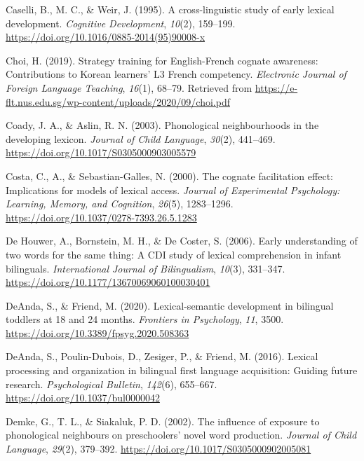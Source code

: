 \documentclass[
  ,man,floatsintext]{apa6}
\newlength{\cslhangindent}
\newlength{\cslentryspacingunit} %
\newenvironment{CSLReferences}[2] %
 {%
  \setlength{\parindent}{0pt}
  \ifodd #1
  \let\oldpar\par
  \def\par{\hangindent=\cslhangindent\oldpar}
  \fi
  \setlength{\parskip}{#2\cslentryspacingunit}
 }%
 {}
\begin{document}
\begin{CSLReferences}{1}{0}
\leavevmode{}%
Caselli, B., M. C., \& Weir, J. (1995). A cross-linguistic study of early lexical development. \emph{Cognitive Development}, \emph{10}(2), 159--199. \url{https://doi.org/10.1016/0885-2014(95)90008-x}

\leavevmode{}%
Choi, H. (2019). Strategy training for {E}nglish-{F}rench cognate awareness: Contributions to {K}orean learners' L3 {F}rench competency. \emph{Electronic Journal of Foreign Language Teaching}, \emph{16}(1), 68--79. Retrieved from \url{https://e-flt.nus.edu.sg/wp-content/uploads/2020/09/choi.pdf}

\leavevmode{}%
Coady, J. A., \& Aslin, R. N. (2003). Phonological neighbourhoods in the developing lexicon. \emph{Journal of Child Language}, \emph{30}(2), 441--469. \url{https://doi.org/10.1017/S0305000903005579}

\leavevmode{}%
Costa, C., A., \& Sebastian-Galles, N. (2000). The cognate facilitation effect: Implications for models of lexical access. \emph{Journal of Experimental Psychology: Learning, Memory, and Cognition}, \emph{26}(5), 1283--1296. \url{https://doi.org/10.1037/0278-7393.26.5.1283}

\leavevmode{}%
De Houwer, A., Bornstein, M. H., \& De Coster, S. (2006). Early understanding of two words for the same thing: A {CDI} study of lexical comprehension in infant bilinguals. \emph{International Journal of Bilingualism}, \emph{10}(3), 331--347. \url{https://doi.org/10.1177/13670069060100030401}

\leavevmode{}%
DeAnda, S., \& Friend, M. (2020). Lexical-semantic development in bilingual toddlers at 18 and 24 months. \emph{Frontiers in Psychology}, \emph{11}, 3500. \url{https://doi.org/10.3389/fpsyg.2020.508363}

\leavevmode{}%
DeAnda, S., Poulin-Dubois, D., Zesiger, P., \& Friend, M. (2016). Lexical processing and organization in bilingual first language acquisition: Guiding future research. \emph{Psychological Bulletin}, \emph{142}(6), 655--667. \url{https://doi.org/10.1037/bul0000042}

\leavevmode{}%
Demke, G., T. L., \& Siakaluk, P. D. (2002). The influence of exposure to phonological neighbours on preschoolers' novel word production. \emph{Journal of Child Language}, \emph{29}(2), 379--392. \url{https://doi.org/10.1017/S0305000902005081}


\end{CSLReferences}
\end{document}
